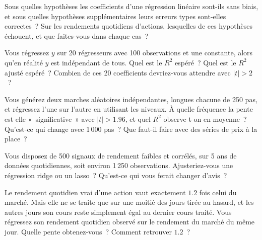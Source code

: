 \begin{question}\label{iq:iv1:regression:15}
Sous quelles hypothèses les coefficients d'une régression linéaire sont-ils sans biais, et sous quelles hypothèses supplémentaires leurs erreurs types sont-elles correctes~? Sur les rendements quotidiens d'actions, lesquelles de ces hypothèses échouent, et que faites-vous dans chaque cas~?
\end{question}

\begin{question}\label{iq:iv1:regression:16}
Vous régressez $y$ sur 20 régresseurs avec 100 observations et une constante, alors qu'en réalité $y$ est indépendant de tous. Quel est le $R^2$ espéré~? Quel est le $R^2$ ajusté espéré~? Combien de ces 20 coefficients devriez-vous attendre avec $|t| > 2$~?
\end{question}

\begin{question}\label{iq:iv1:regression:17}
Vous générez deux marches aléatoires indépendantes, longues chacune de 250 pas, et régressez l'une sur l'autre en utilisant les niveaux. À quelle fréquence la pente est-elle «~significative~» avec $|t| > 1.96$, et quel $R^2$ observe-t-on en moyenne~? Qu'est-ce qui change avec 1\,000 pas~? Que faut-il faire avec des séries de prix à la place~?
\end{question}

\begin{question}\label{iq:iv1:regression:18}
Vous disposez de 500 signaux de rendement faibles et corrélés, sur 5 ans de données quotidiennes, soit environ 1\,250 observations. Ajusteriez-vous une régression ridge ou un lasso~? Qu'est-ce qui vous ferait changer d'avis~?
\end{question}

\begin{question}\label{iq:iv1:regression:19}
Le rendement quotidien vrai d'une action vaut exactement $1.2$ fois celui du marché. Mais elle ne se traite que sur une moitié des jours tirée au hasard, et les autres jours son cours reste simplement égal au dernier cours traité. Vous régressez son rendement quotidien observé sur le rendement du marché du même jour. Quelle pente obtenez-vous~? Comment retrouver $1.2$~?
\end{question}

